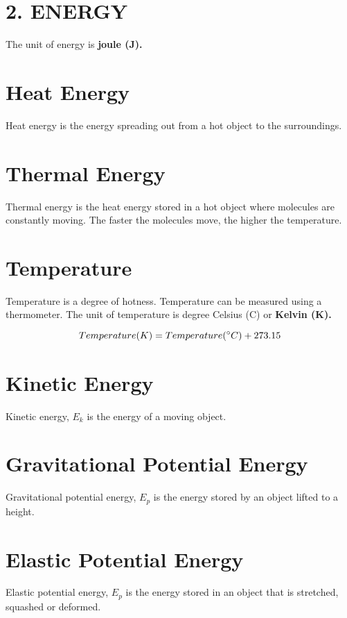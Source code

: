 \documentclass{report}
\begin{document}
\begin{flushleft}
\newpage

\section*{2. ENERGY}
\normalfont The unit of energy is \bf{joule (J)}. 

\section*{Heat Energy}
\normalfont Heat energy is the energy spreading out from a hot object to the surroundings. 

\section*{Thermal Energy}
\normalfont Thermal energy is the heat energy stored in a hot object where molecules are constantly moving. The faster the molecules move, the higher the temperature. 

\section*{Temperature}
\normalfont Temperature is a degree of hotness. Temperature can be measured using a thermometer. The unit of temperature is degree Celsius (\degree C) or \bf{Kelvin (K)}. 

\begin{equation}
Temperature (K) = Temperature (\degree C) + 273.15
\end{equation}

\section*{Kinetic Energy}
\normalfont Kinetic energy, $E_k$ is the energy of a moving object.

\section*{Gravitational Potential Energy}
\normalfont Gravitational potential energy, $E_p$ is the energy stored by an object lifted to a height. 

\section*{Elastic Potential Energy}
\normalfont Elastic potential energy, $E_p$ is the energy stored in an object that is stretched, squashed or deformed.


\end{flushleft}
\end{document}
